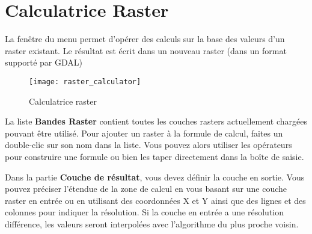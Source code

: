  \section{Calculatrice Raster}\label{sec:raster_calc}

La fenêtre  du menu  permet d'opérer des calculs sur la base des valeurs d'un raster existant. Le résultat est écrit dans un nouveau raster (dans un format supporté par GDAL)
 
 \begin{figure}[ht]
   \centering
     \texttt{[image: raster\_calculator]}
     \caption{Calculatrice raster \nixcaption}\label{fig:raster_calculator}
 \end{figure}


La liste \textbf{Bandes Raster} contient toutes les couches rasters actuellement chargées pouvant être utilisé. Pour ajouter un raster à la formule de calcul, faites un double-clic sur son nom dans la liste. Vous pouvez alors utiliser les opérateurs pour construire une formule ou bien les taper directement dans la boîte de saisie.

Dans la partie \textbf{Couche de résultat}, vous devez définir la couche en sortie. Vous pouvez préciser l'étendue de la zone de calcul en vous basant sur une couche raster en entrée ou en utilisant des coordonnées X et Y ainsi que des lignes et des colonnes pour indiquer la résolution. Si la couche en entrée a une résolution différence, les valeurs seront interpolées avec l'algorithme du plus proche voisin.


